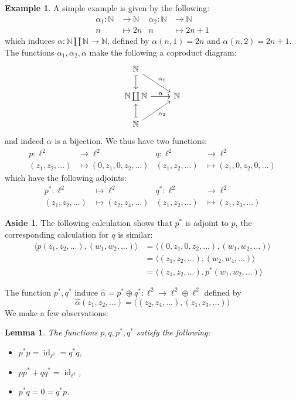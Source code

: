 \documentclass[12pt]{article}
\theoremstyle{plain}
\newtheorem{lemma}[thm]{Lemma}
\theoremstyle{definition}
\newtheorem{example}[thm]{Example}
\newtheorem{aside}[thm]{Aside}
\newcommand{\bb}[1]{\mathbb{#1}}
\newcommand{\lto}{\longrightarrow}
\begin{document}
\begin{example}
A simple example is given by the following:
\begin{align*}
    \alpha_1: \bb{N} &\lto \bb{N} & \alpha_2: \bb{N} &\lto \bb{N}\\
    n &\longmapsto 2n & n &\longmapsto 2n + 1
\end{align*}
which induces $\alpha: \bb{N} \coprod \bb{N} \lto \bb{N}$, defined by $\alpha(n,1) = 2n$ and $\alpha(n,2) = 2n+1$. The functions $\alpha_1,\alpha_2,\alpha$ make the following a coproduct diagram:
\begin{equation}
    \begin{tikzcd}
    \bb{N}\arrow[dr,"{\alpha_1}"]\arrow[d,rightarrowtail]\\
    \bb{N}\arrow[r,"{\alpha}"] \coprod \bb{N}\arrow[r,"{\alpha}"] & \bb{N}\\
    \bb{N}\arrow[ur,swap,"{\alpha_2}"]\arrow[u,rightarrowtail]
    \end{tikzcd}
\end{equation}
and indeed $\alpha$ is a bijection. We thus have two functions:
\begin{align*}
    p: \ell^2 & \lto \ell^2 & q: \ell^2 &\lto \ell^2\\
    (z_1,z_2,...) &\longmapsto (0, z_1, 0, z_2, ...) & (z_1,z_2,...) &\longmapsto (z_1, 0, z_2, 0, ...)
\end{align*}
which have the following adjoints:
\begin{align*}
    p^\ast: \ell^2 &\longmapsto \ell^2 & q^\ast: \ell^2 &\lto \ell^2\\
    (z_1,z_2,...) &\longmapsto (z_2,z_4,...) & (z_1,z_2,...) &\longmapsto (z_1,z_3,...)
\end{align*}
\begin{aside}
The following calculation shows that $p^\ast$ is adjoint to $p$, the corresponding calculation for $q$ is similar:
\begin{align*}
    \big\langle p(z_1,z_2,...),(w_1,w_2,...)\big\rangle &= \big\langle (0,z_1,0,z_2,...),(w_1,w_2,...)\big\rangle\\
    &= \big\langle (z_1,z_2,...),(w_2,w_4,...)\big\rangle\\
    &= \big\langle (z_1,z_2,...),p^\ast(w_1,w_2,...)\big\rangle
\end{align*}
\end{aside}
The function $p^\ast,q^\ast$ induce $\hat{\alpha} = p^\ast \oplus q^\ast: \ell^2 \lto \ell^2 \oplus \ell^2$ defined by
\begin{equation}
    \hat{\alpha}(z_1,z_2,...) = \big((z_2,z_4,...),(z_1,z_3,...)\big)
\end{equation}
We make a few observations:
\begin{lemma}\label{lem:operator_properties}
The functions $p,q,p^\ast,q^\ast$ satisfy the following:
\begin{itemize}
    \item $p^\ast p = \operatorname{id}_{\ell^2} = q^\ast q$,
    \item $p p^\ast + q q^\ast = \operatorname{id}_{\ell^2}$,
    \item $p^\ast q = 0 = q^\ast p$.
\end{itemize}
\end{lemma}
\end{example}
\end{document}
